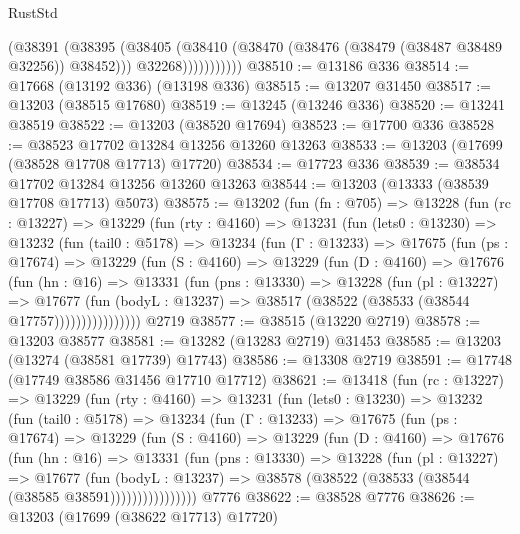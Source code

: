 \begin{lexlean}{RustStd}
\begin{coremodule}
                    (@38391
                      (@38395
                        (@38405
                          (@38410 (@38470 (@38476 (@38479 (@38487 @38489 @32256)) @38452)))
                          @32268)))))))))))
@38510 := @13186 @336
@38514 := @17668 (@13192 @336) (@13198 @336)
@38515 := @13207 @31450
@38517 := @13203 (@38515 @17680)
@38519 := @13245 (@13246 @336)
@38520 := @13241 @38519
@38522 := @13203 (@38520 @17694)
@38523 := @17700 @336
@38528 := @38523 @17702 @13284 @13256 @13260 @13263
@38533 := @13203 (@17699 (@38528 @17708 @17713) @17720)
@38534 := @17723 @336
@38539 := @38534 @17702 @13284 @13256 @13260 @13263
@38544 := @13203 (@13333 (@38539 @17708 @17713) @5073)
@38575 := @13202
    (fun (fn : @705) =>
    @13228
      (fun (rc : @13227) =>
      @13229
        (fun (rty : @4160) =>
        @13231
          (fun (lets0 : @13230) =>
          @13232
            (fun (tail0 : @5178) =>
            @13234
              (fun (Γ : @13233) =>
              @17675
                (fun (ps : @17674) =>
                @13229
                  (fun (S : @4160) =>
                  @13229
                    (fun (D : @4160) =>
                    @17676
                      (fun (hn : @16) =>
                      @13331
                        (fun (pns : @13330) =>
                        @13228
                          (fun (pl : @13227) =>
                          @17677
                            (fun (bodyL : @13237) =>
                            @38517 (@38522 (@38533 (@38544 @17757))))))))))))))))
    @2719
@38577 := @38515 (@13220 @2719)
@38578 := @13203 @38577
@38581 := @13282 (@13283 @2719) @31453
@38585 := @13203 (@13274 (@38581 @17739) @17743)
@38586 := @13308 @2719
@38591 := @17748 (@17749 @38586 @31456 @17710 @17712)
@38621 := @13418
    (fun (rc : @13227) =>
    @13229
      (fun (rty : @4160) =>
      @13231
        (fun (lets0 : @13230) =>
        @13232
          (fun (tail0 : @5178) =>
          @13234
            (fun (Γ : @13233) =>
            @17675
              (fun (ps : @17674) =>
              @13229
                (fun (S : @4160) =>
                @13229
                  (fun (D : @4160) =>
                  @17676
                    (fun (hn : @16) =>
                    @13331
                      (fun (pns : @13330) =>
                      @13228
                        (fun (pl : @13227) =>
                        @17677
                          (fun (bodyL : @13237) =>
                          @38578 (@38522 (@38533 (@38544 (@38585 @38591))))))))))))))))
    @7776
@38622 := @38528 @7776
@38626 := @13203 (@17699 (@38622 @17713) @17720)

\end{coremodule}
\end{lexlean}
